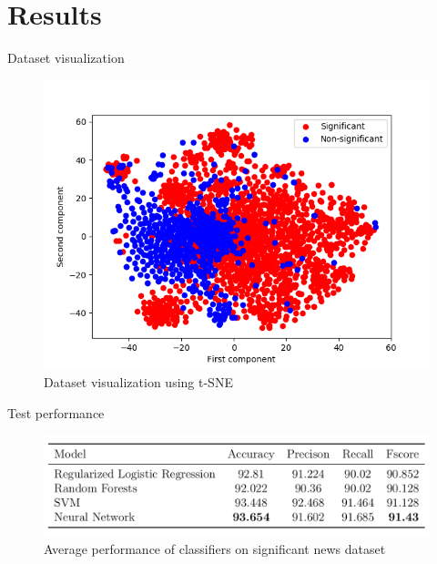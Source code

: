 \documentclass[12pt]{beamer}
\begin{document}
\section{Results}

\begin{frame}{Dataset visualization}
\begin{figure}[h]
    \includegraphics[scale=0.5]{images/data_visualization.png}
    \caption{Dataset visualization using t-SNE}
    \label{fig:dataset}
\end{figure}
\end{frame}

\begin{frame}{Test performance}
\begin{figure}[h]
    \includegraphics[width=\textwidth]{images/avg_performance.png}
    \caption{Average performance of classifiers on significant news dataset}
    \label{tbl:average_performance}
\end{figure}
\end{frame}
\end{document}
